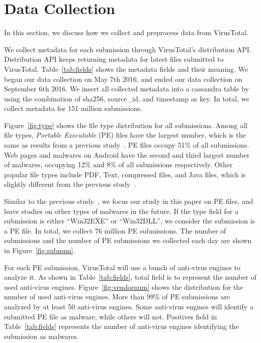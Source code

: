 \section{Data Collection}
\label{sec:label}


In this section, we discuss how we collect and preprocess data from VirusTotal. 



We collect metadata for each submission through VirusTotal’s distribution API. 
Distribution API keeps returning metadata for latest files submitted to VirusTotal.
Table~\ref{tab:fields} shows the metadata fields and their meaning.  
We began our data collection on May 7th 2016, 
and ended our data collection on September 6th 2016. 
We insert all collected metadata into a cassandra table by using the combination of sha256, source\_id, and timestamp as key.
In total, we collect metadata for 151 million submissions. 

Figure~\ref{fig:type} shows the file type distribution for all submissions. 
Among all file types, \textit{Portable Executable} (PE) files have the largest number, which is the same as results from a previous study~\cite{SongAPsys2016}.
PE files occupy 51\% of all submissions. 
Web pages and malwares on Android have the second and third largest number of malwares, 
occupying 12\% and 8\% of all submissions respectively. 
Other popular file types include PDF, Text, compressed files, and Java files, which is slightly different from the previous study~\cite{SongAPsys2016}. 

Similar to the previous study~\cite{SongAPsys2016}, 
we focus our study in this paper on PE files, 
and leave studies on other types of malwares in the future. 
If the type field for a submission is either ``Win32EXE'' or ``Win32DLL'', 
we consider the submission is a PE file. 
In total, we collect 76 million PE submissions. 
The number of submissions and the number of PE submissions we collected each day are shown in Figure~\ref{fig:subnum}. 





For each PE submission, VirusTotal will use a bunch of anti-virus engines to analyze it.
As shown in Table~\ref{tab:fields}, 
total field is to represent the number of used anti-virus engines. 
Figure~\ref{fig:vendornum} shows the distribution for the number of used anti-virus engines. 
More than 99\% of PE submissions are analyzed by at least 50 anti-virus engines. 
Some anti-virus engines will identify a submitted PE file as malware, while others will not. 
Positives field in Table~\ref{tab:fields} represents the number of anti-virus engines identifying the submission as malwares. 

